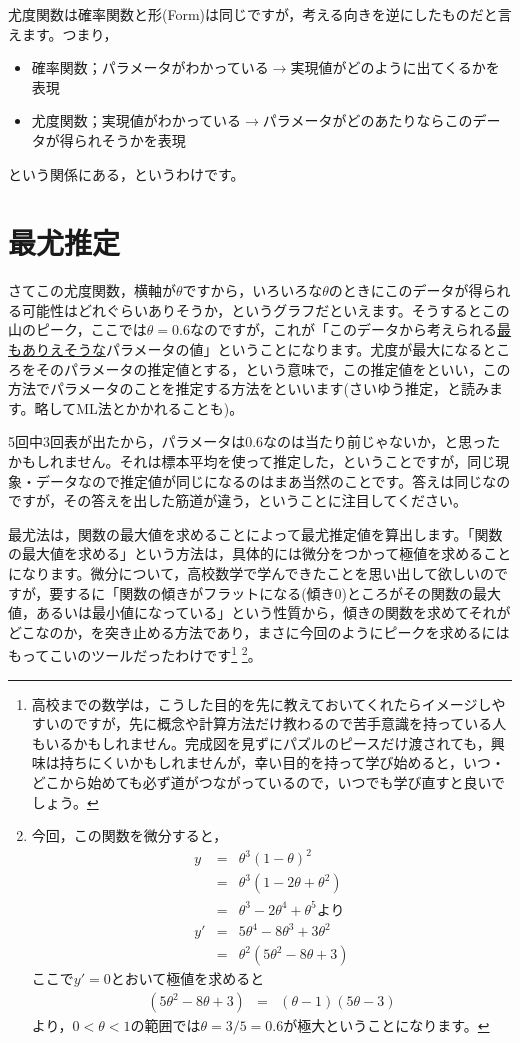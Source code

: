 \documentclass{ltjsbook}
\begin{document}
尤度関数は確率関数と形(Form)は同じですが，考える向きを逆にしたものだと言えます。つまり，
\begin{itemize}
	\item 確率関数；パラメータがわかっている$\to$実現値がどのように出てくるかを表現
	\item 尤度関数；実現値がわかっている$\to$パラメータがどのあたりならこのデータが得られそうかを表現
\end{itemize}
という関係にある，というわけです。

\section{最尤推定}
さてこの尤度関数，横軸が$\theta$ですから，いろいろな$\theta$のときにこのデータが得られる可能性はどれぐらいありそうか，というグラフだといえます。そうするとこの山のピーク，ここでは$\theta=0.6$なのですが，これが「このデータから考えられる\underline{最もありえそうな}パラメータの値」ということになります。尤度が最大になるところをそのパラメータの推定値とする，という意味で，この推定値をといい，この方法でパラメータのことを推定する方法をといいます(さいゆう推定，と読みます。略してML法とかかれることも)。

5回中3回表が出たから，パラメータは$0.6$なのは当たり前じゃないか，と思ったかもしれません。それは標本平均を使って推定した，ということですが，同じ現象・データなので推定値が同じになるのはまあ当然のことです。答えは同じなのですが，その答えを出した筋道が違う，ということに注目してください。

最尤法は，関数の最大値を求めることによって最尤推定値を算出します。「関数の最大値を求める」という方法は，具体的には微分をつかって極値を求めることになります。微分について，高校数学で学んできたことを思い出して欲しいのですが，要するに「関数の傾きがフラットになる(傾き$0$)ところがその関数の最大値，あるいは最小値になっている」という性質から，傾きの関数を求めてそれがどこなのか，を突き止める方法であり，まさに今回のようにピークを求めるにはもってこいのツールだったわけです\footnote{高校までの数学は，こうした目的を先に教えておいてくれたらイメージしやすいのですが，先に概念や計算方法だけ教わるので苦手意識を持っている人もいるかもしれません。完成図を見ずにパズルのピースだけ渡されても，興味は持ちにくいかもしれませんが，幸い目的を持って学び始めると，いつ・どこから始めても必ず道がつながっているので，いつでも学び直すと良いでしょう。}
\footnote{今回，この関数を微分すると，
	\begin{eqnarray*}
		y &=& \theta^3(1-\theta)^2 \\
		& =& \theta^3(1-2\theta+\theta^2)\\
		&=& \theta^3 - 2\theta^4 + \theta^5 \mbox{より}\\
		y' &=& 5\theta^4 - 8\theta^3 + 3\theta^2\\
		&=& \theta^2(5\theta^2-8\theta+3)
	\end{eqnarray*}
	ここで$y'=0$とおいて極値を求めると
	\begin{eqnarray*}
		(5\theta^2-8\theta+3) &=& (\theta -1)(5\theta -3)
	\end{eqnarray*}
	より，$0< \theta < 1$の範囲では$\theta=3/5=0.6$が極大ということになります。
}。
\end{document}

